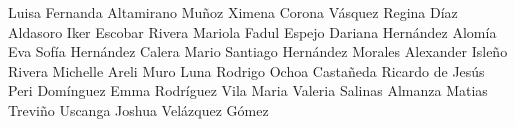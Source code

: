 Luisa Fernanda Altamirano Muñoz
Ximena Corona Vásquez
Regina Díaz Aldasoro
Iker Escobar Rivera
Mariola Fadul Espejo
Dariana Hernández Alomía
Eva Sofía Hernández Calera
Mario Santiago Hernández Morales
Alexander Isleño Rivera
Michelle Areli Muro Luna
Rodrigo Ochoa Castañeda
Ricardo de Jesús Peri Domínguez
Emma Rodríguez Vila
Maria Valeria Salinas Almanza
Matias Treviño Uscanga
Joshua Velázquez Gómez
